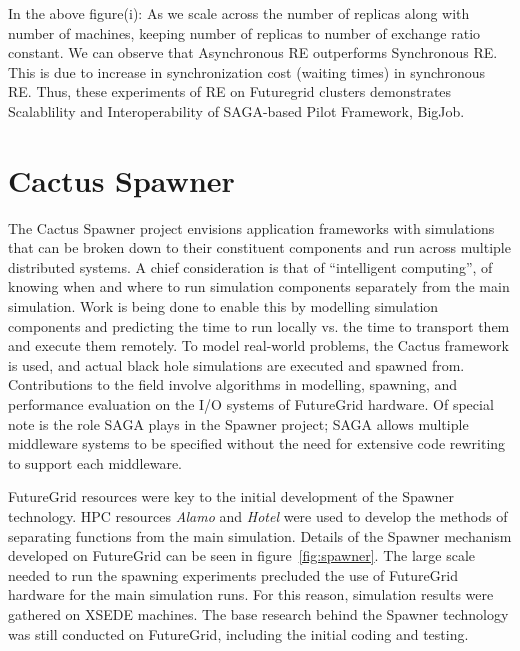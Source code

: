 \documentclass[]{paper}
\newcommand{\mrnote}[1]{ {\textcolor{cyan} { ***Melissa: #1 }}}
\newcommand{\mrnote}[1]{}
\begin{document}
In the above figure(i): As we scale across the number of replicas along with number of machines, keeping number of replicas to number of exchange ratio constant. We can observe that Asynchronous RE outperforms Synchronous RE. This is due to increase in synchronization cost (waiting times) in synchronous RE. Thus, these experiments of RE on Futuregrid clusters demonstrates Scalablility and Interoperability of SAGA-based Pilot Framework, BigJob.


\section{Cactus Spawner}
The Cactus Spawner project envisions application frameworks with simulations that
can be broken down to their constituent components and run across multiple
distributed systems.  A chief consideration is that of ``intelligent computing'',
of knowing when and where to run simulation components separately from the main
simulation.  Work is being done to enable this by modelling simulation components
and predicting the time to run locally vs. the time to transport them and execute
them remotely.  To model real-world problems, the Cactus framework is used, and
actual black hole simulations are executed and spawned from.  Contributions
to the field involve algorithms in modelling, spawning, and performance evaluation on
the I/O systems of FutureGrid hardware.  Of special note is the role SAGA plays in the
Spawner project; SAGA allows multiple middleware systems to be specified without the need
for extensive code rewriting to support each middleware.

FutureGrid resources were key to the initial development of the Spawner technology.
HPC resources \textit{Alamo} and \textit{Hotel} were used to develop the methods of separating functions
from the main simulation. Details of the Spawner
mechanism developed on FutureGrid can be seen in figure~\ref{fig:spawner}.
The large scale needed to run the spawning experiments precluded the use
of FutureGrid hardware for the main simulation runs.   For this reason, simulation results were gathered
on XSEDE machines.  The base research behind the Spawner technology
was still conducted on FutureGrid, including the initial coding and testing.  
\end{document}
